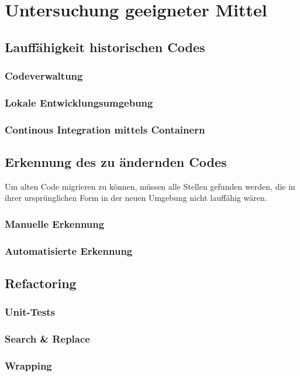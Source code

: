 \chapter{Untersuchung geeigneter Mittel}\label{ch:tools} 

\section{Lauffähigkeit historischen Codes}
    \subsection{Codeverwaltung}
    \subsection{Lokale Entwicklungsumgebung}
    \subsection{Continous Integration mittels Containern}

\section{Erkennung des zu ändernden Codes}
Um alten Code migrieren zu können, müssen alle Stellen gefunden werden, die in ihrer ursprünglichen Form in der neuen Umgebung nicht lauffähig wären.
    \subsection{Manuelle Erkennung}

    \subsection{Automatisierte Erkennung}

\section{Refactoring}
    \subsection{Unit-Tests}
    \subsection{Search \& Replace}
    \subsection{Wrapping}
